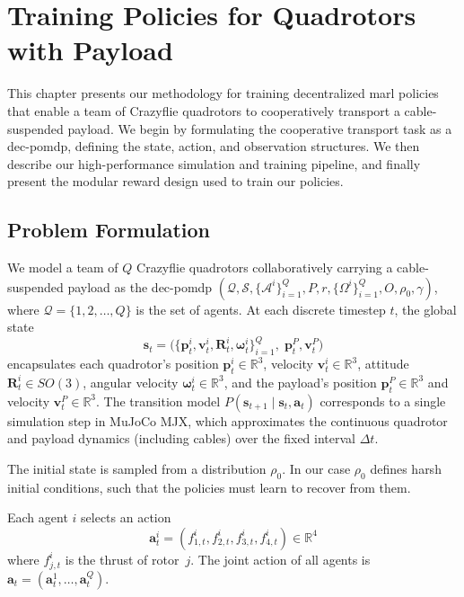 \chapter{Training  Policies for Quadrotors with Payload}

This chapter presents our methodology for training decentralized \gls{marl} policies that enable a team of Crazyflie quadrotors to cooperatively transport a cable-suspended payload. We begin by formulating the cooperative transport task as a \gls{dec-pomdp}, defining the state, action, and observation structures. We then describe our high-performance simulation and training pipeline, and finally present the modular reward design used to train our policies.
\section{Problem Formulation}

We model a team of $Q$ Crazyflie quadrotors collaboratively carrying a cable-suspended payload as the \gls{dec-pomdp} $(\mathcal{Q}, \mathcal{S}, \{\mathcal{A}^i\}_{i=1}^Q, P, r, \{\Omega^i\}_{i=1}^Q, O, \rho_0, \gamma)$, where $\mathcal{Q} = \{1,2,\dots,Q\}$ is the set of agents. At each discrete timestep $t$, the global state 
\begin{equation}
\mathbf{s}_t = \bigl(\{\mathbf{p}^i_t,\mathbf{v}^i_t,\mathbf{R}^i_t,\boldsymbol{\omega}^i_t\}_{i=1}^Q,\; \mathbf{p}^P_t,\mathbf{v}^P_t\bigr)
\end{equation}
encapsulates each quadrotor's position $\mathbf{p}^i_t \in \mathbb{R}^3$, velocity $\mathbf{v}^i_t \in \mathbb{R}^3$, attitude $\mathbf{R}^i_t \in SO(3)$, angular velocity $\boldsymbol{\omega}^i_t \in \mathbb{R}^3$, and the payload's position $\mathbf{p}^P_t \in \mathbb{R}^3$ and velocity $\mathbf{v}^P_t \in \mathbb{R}^3$. The transition model $P(\mathbf{s}_{t+1}\mid \mathbf{s}_t, \mathbf{a}_t)$ corresponds to a single simulation step in MuJoCo MJX, which approximates the continuous quadrotor and payload dynamics (including cables) over the fixed interval $\Delta t$.

The initial state is sampled from a distribution $\rho_0$. In our case $\rho_0$ defines harsh initial conditions, such that the policies must learn to recover from them.

Each agent $i$ selects an action 
\begin{equation}
  \mathbf{a}^i_t = (f^i_{1,t},f^i_{2,t},f^i_{3,t},f^i_{4,t}) \in \mathbb{R}^4
\end{equation}
where $f^i_{j,t}$ is the thrust of rotor~$j$. The joint action of all agents is $\mathbf{a}_t = (\mathbf{a}^1_t,\dots,\mathbf{a}^Q_t)$. 

